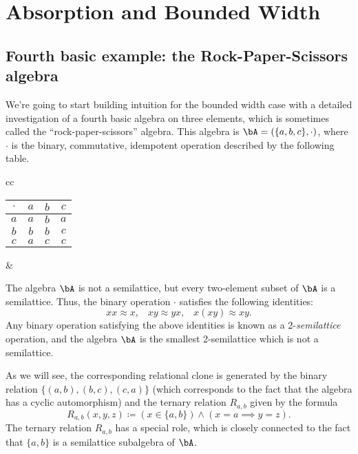 \chapter{Absorption and Bounded Width}\label{chapter-bounded-width}


\section{Fourth basic example: the Rock-Paper-Scissors algebra}\label{s-rps}

We're going to start building intuition for the bounded width case with a detailed investigation of a fourth basic algebra on three elements, which is sometimes called the ``rock-paper-scissors'' algebra. This algebra is $\bA = (\{a,b,c\}, \cdot)$, where $\cdot$ is the binary, commutative, idempotent operation described by the following table.
\begin{center}
\begin{tabular}{cc}%
\begin{tabular}{c|ccc} $\cdot$ & $a$ & $b$ & $c$\\ \hline $a$ & $a$ & $b$ & $a$\\ $b$ & $b$ & $b$ & $c$\\ $c$ & $a$ & $c$ & $c$\end{tabular} & 
\end{tabular}
\end{center}
The algebra $\bA$ is not a semilattice, but every two-element subset of $\bA$ is a semilattice. Thus, the binary operation $\cdot$ satisfies the following identities:
\[
xx \approx x, \;\;\; xy \approx yx, \;\;\; x(xy) \approx xy.
\]
Any binary operation satisfying the above identities is known as a 2-\emph{semilattice} operation, and the algebra $\bA$ is the smallest 2-semilattice which is not a semilattice.

As we will see, the corresponding relational clone is generated by the binary relation $\{(a,b), (b,c), (c,a)\}$ (which corresponds to the fact that the algebra has a cyclic automorphism) and the ternary relation $R_{a,b}$ given by the formula
\[
R_{a,b}(x,y,z) \coloneqq (x \in \{a,b\}) \wedge (x = a \implies y = z).
\]
The ternary relation $R_{a,b}$ has a special role, which is closely connected to the fact that $\{a,b\}$ is a semilattice subalgebra of $\bA$.

